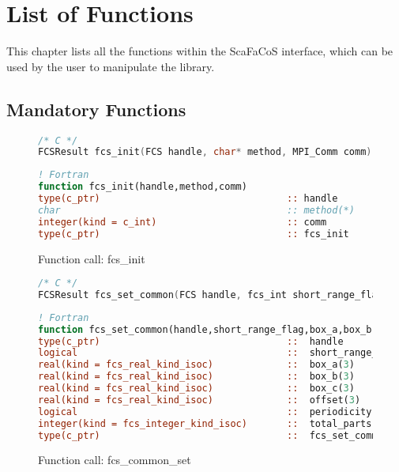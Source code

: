 \chapter{List of Functions}
\label{cha:appendix_function_list}

This chapter lists all the functions within the ScaFaCoS interface, which can be used by the user to manipulate the library.

\section{Mandatory Functions}
\begin{figure}[htb]
\begin{lstlisting}[language=C,frame=trBL,breaklines,basicstyle=\ttfamily]
/* C */
FCSResult fcs_init(FCS handle, char* method, MPI_Comm comm);
\end{lstlisting}
\begin{lstlisting}[language=Fortran,frame=trBL,breaklines,basicstyle=\ttfamily]
! Fortran
function fcs_init(handle,method,comm)
type(c_ptr)                                 :: handle
char                                        :: method(*)
integer(kind = c_int)                       :: comm
type(c_ptr)                                 :: fcs_init
\end{lstlisting}
\caption{Function call: fcs\_init}
\label{fig:fcs_init}
\end{figure}
\begin{figure}[htb]
\begin{lstlisting}[language=C,frame=trBL,breaklines,basicstyle=\ttfamily,prebreak={\raisebox{0ex}[0ex][0ex]{\ensuremath{\hookleftarrow}}}]
/* C */
FCSResult fcs_set_common(FCS handle, fcs_int short_range_flag, fcs_float* box_a, fcs_float* box_b, fcs_float* box_c, fcs_float* offset, fcs_int* periodicity, fcs_int total_particles);
\end{lstlisting}
\begin{lstlisting}[language=Fortran,frame=trBL,breaklines,basicstyle=\ttfamily,prebreak={\raisebox{0ex}[0ex][0ex]{\ensuremath{\hookleftarrow}}}]
! Fortran
function fcs_set_common(handle,short_range_flag,box_a,box_b,box_c,offset,periodicity,total_particles)
type(c_ptr)                                 ::  handle
logical                                     ::  short_range_flag
real(kind = fcs_real_kind_isoc)             ::  box_a(3)
real(kind = fcs_real_kind_isoc)             ::  box_b(3)
real(kind = fcs_real_kind_isoc)             ::  box_c(3)
real(kind = fcs_real_kind_isoc)             ::  offset(3)
logical                                     ::  periodicity(3)
integer(kind = fcs_integer_kind_isoc)       ::  total_parts
type(c_ptr)                                 ::  fcs_set_common
\end{lstlisting}
\caption{Function call: fcs\_common\_set}
\label{fig:fcs_set_common}
\end{figure}
